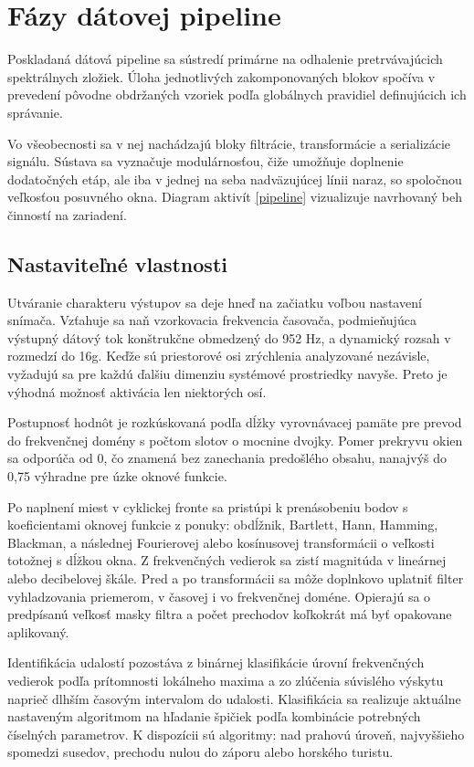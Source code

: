 \section{Fázy dátovej pipeline}
Poskladaná dátová pipeline sa sústredí primárne na odhalenie pretrvávajúcich spektrálnych zložiek. Úloha jednotlivých
zakomponovaných blokov spočíva v prevedení pôvodne obdržaných vzoriek podľa globálnych pravidiel definujúcich ich správanie.

Vo všeobecnosti sa v nej nachádzajú bloky filtrácie, transformácie a serializácie signálu. Sústava sa
vyznačuje modulárnosťou, čiže umožňuje doplnenie dodatočných etáp, ale iba v jednej na seba nadväzujúcej
línii naraz, so spoločnou veľkosťou posuvného okna. Diagram aktivít \ref{pipeline}
vizualizuje navrhovaný beh činností na zariadení.

\subsection{Nastaviteľné vlastnosti}
Utváranie charakteru výstupov sa deje hneď na začiatku voľbou nastavení snímača.
Vzťahuje sa naň vzorkovacia frekvencia časovača, podmieňujúca výstupný dátový tok konštrukčne obmedzený do 952 Hz,
a dynamický rozsah v rozmedzí do 16g. Keďže sú priestorové osi zrýchlenia analyzované nezávisle, vyžadujú sa pre každú ďalšiu
dimenziu systémové prostriedky navyše. Preto je výhodná možnosť aktivácia len niektorých osí.

Postupnosť hodnôt je rozkúskovaná podľa dĺžky vyrovnávacej pamäte pre prevod do frekvenčnej domény s počtom slotov
o mocnine dvojky. Pomer prekryvu okien sa odporúča od 0, čo znamená bez zanechania predošlého obsahu, nanajvýš
do 0,75 výhradne pre úzke oknové funkcie.

Po naplnení miest v cyklickej fronte sa pristúpi k prenásobeniu bodov s koeficientami oknovej funkcie
z ponuky: obdĺžnik, Bartlett, Hann, Hamming, Blackman, a následnej Fourierovej alebo kosínusovej transformácii
o veľkosti totožnej s dĺžkou okna. Z frekvenčných vedierok sa zistí magnitúda v lineárnej alebo decibelovej škále.
Pred a po transformácii sa môže doplnkovo uplatniť filter vyhladzovania priemerom, v časovej i vo frekvenčnej doméne.
Opierajú sa o predpísanú veľkosť masky filtra a počet prechodov koľkokrát má byť opakovane aplikovaný.

Identifikácia udalostí pozostáva z binárnej klasifikácie úrovní frekvenčných vedierok podľa prítomnosti lokálneho maxima a
zo zlúčenia súvislého výskytu naprieč dlhším časovým intervalom do udalosti. Klasifikácia sa realizuje
aktuálne nastaveným algoritmom na hľadanie špičiek podľa kombinácie potrebných číselných parametrov. K dispozícii sú
algoritmy: nad prahovú úroveň, najvyššieho spomedzi susedov, prechodu nulou do záporu alebo horského turistu.

